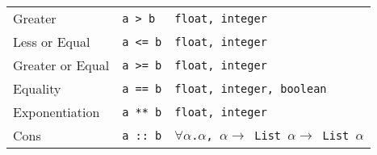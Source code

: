 \documentclass{l4proj}
\begin{document}
\begin{table}[h!]
\begin{center}
\begin{tabular}{@{}|l|l|l|@{}}
    Greater               & \texttt{a > b}        &   \texttt{float, integer} \\
    Less or Equal         & \texttt{a <= b}       &   \texttt{float, integer} \\
    Greater or Equal      & \texttt{a >= b}       &   \texttt{float, integer} \\
    Equality              & \texttt{a == b}       &   \texttt{float, integer, boolean} \\
    Exponentiation        & \texttt{a ** b}       &   \texttt{float, integer} \\
    Cons                  & \texttt{a :: b}       &   \texttt{$\forall \alpha$.$\alpha$, $\alpha \rightarrow$ List $\alpha \rightarrow$ List $\alpha$} \\
    \hline
    \end{tabular}
    \end{center}
\end{table}
\end{document}
